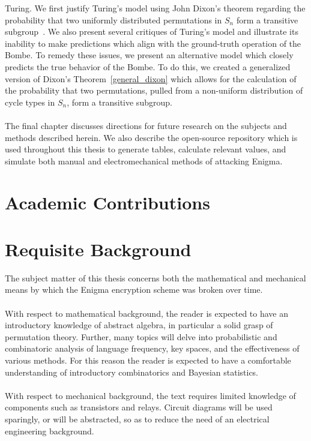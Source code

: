 \documentclass{dcthesis}
\theoremstyle{definition}
\theoremstyle{remark}
\begin{document}
Turing. We first justify Turing's model using John Dixon's theorem regarding the probability that two uniformly distributed permutations in $S_n$ form a transitive subgroup~\cite{Dixon1969}. We also present several critiques of Turing's model and illustrate its inability to make predictions which align with the ground-truth operation of the Bombe. To remedy these issues, we present an alternative model which closely predicts the true behavior of the Bombe. To do this, we created a generalized version of Dixon's Theorem~\ref{general_dixon} which allows for the calculation of the probability that two permutations, pulled from a non-uniform distribution of cycle types in $S_n$, form a transitive subgroup. 
\\\\The final chapter discusses directions for future research on the subjects and methods described herein. We also describe the open-source repository which is used throughout this thesis to generate tables, calculate relevant values, and simulate both manual and electromechanical methods of attacking Enigma.

\chapter*{Academic Contributions}


\chapter*{Requisite Background}
The subject matter of this thesis concerns both the mathematical and
mechanical means by which the Enigma encryption scheme was broken over time.
\\\\With respect to mathematical background, the reader is expected
to have an introductory knowledge of abstract algebra, in particular
a solid grasp of permutation theory. Further, many topics will delve
into probabilistic and combinatoric analysis of language frequency,
key spaces, and the effectiveness of various methods. For this reason
the reader is expected to have a comfortable understanding of
introductory combinatorics and Bayesian statistics.
\\\\With respect to mechanical background, the text requires
limited knowledge of components such as transistors and relays.
Circuit diagrams will be used sparingly, or will be abstracted, so as
to reduce the need of an electrical engineering background.
\end{document}
